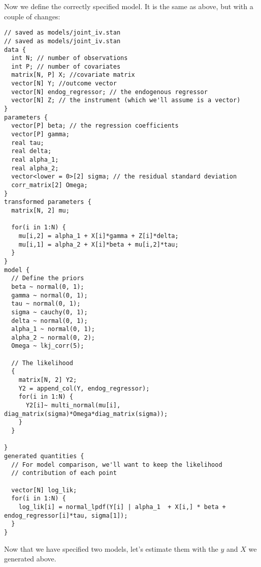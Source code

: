 \documentclass[]{book}
\begin{document}
Now we define the correctly specified model. It is the same as above,
but with a couple of changes:

\begin{verbatim}
// saved as models/joint_iv.stan
// saved as models/joint_iv.stan
data {
  int N; // number of observations
  int P; // number of covariates
  matrix[N, P] X; //covariate matrix
  vector[N] Y; //outcome vector
  vector[N] endog_regressor; // the endogenous regressor
  vector[N] Z; // the instrument (which we'll assume is a vector)
}
parameters {
  vector[P] beta; // the regression coefficients
  vector[P] gamma;
  real tau;
  real delta;
  real alpha_1;
  real alpha_2;
  vector<lower = 0>[2] sigma; // the residual standard deviation
  corr_matrix[2] Omega;
}
transformed parameters {
  matrix[N, 2] mu;
  
  for(i in 1:N) {
    mu[i,2] = alpha_1 + X[i]*gamma + Z[i]*delta;
    mu[i,1] = alpha_2 + X[i]*beta + mu[i,2]*tau;
  }
}
model {
  // Define the priors
  beta ~ normal(0, 1); 
  gamma ~ normal(0, 1);
  tau ~ normal(0, 1);
  sigma ~ cauchy(0, 1);
  delta ~ normal(0, 1);
  alpha_1 ~ normal(0, 1);
  alpha_2 ~ normal(0, 2);
  Omega ~ lkj_corr(5);
  
  // The likelihood
  {
    matrix[N, 2] Y2;
    Y2 = append_col(Y, endog_regressor);
    for(i in 1:N) {
      Y2[i]~ multi_normal(mu[i], diag_matrix(sigma)*Omega*diag_matrix(sigma));
    }
  }
  
}
generated quantities {
  // For model comparison, we'll want to keep the likelihood
  // contribution of each point

  vector[N] log_lik;
  for(i in 1:N) {
    log_lik[i] = normal_lpdf(Y[i] | alpha_1  + X[i,] * beta + endog_regressor[i]*tau, sigma[1]);
  }
}
\end{verbatim}

Now that we have specified two models, let's estimate them with the
\(y\) and \(X\) we generated above.
\end{document}

